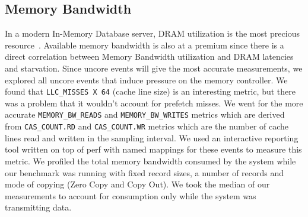


\subsection{Memory Bandwidth}
In a modern In-Memory Database server, DRAM utilization is the most precious resource~\cite{ramcloudfast}. 
 Available memory bandwidth is also at a premium since there is a direct correlation between Memory Bandwidth
 utilization and DRAM latencies and starvation. Since uncore events will give the most accurate measurements,
 we explored all uncore events that induce pressure on the memory controller. We found that 
\texttt{LLC\_MISSES X 64} (cache line size) is an interesting metric, but there was a problem that it wouldn't account for prefetch 
 misses. We went for the more accurate \texttt{MEMORY\_BW\_READS} and \texttt{MEMORY\_BW\_WRITES} metrics which are derived from 
 \texttt{CAS\_COUNT.RD} and \texttt{CAS\_COUNT.WR} metrics which are the number of cache lines read and written in the sampling 
 interval. We used an interactive reporting tool written on top of perf with named mappings for these events
 to measure this metric. We profiled the total memory bandwidth consumed by the system while our benchmark 
 was running with fixed record sizes, a number of records and mode of copying (Zero Copy and Copy Out). We took the median of our measurements 
 to account for consumption only while the system was transmitting data.


